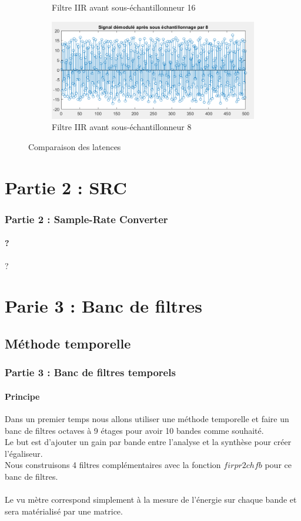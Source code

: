 \documentclass[
10pt,
aspectratio=169,
]{beamer}
\begin{document}
\begin{frame}
\begin{figure}
\begin{subfigure}{0.4\textwidth}
    \caption{Filtre IIR avant sous-échantillonneur 16}
\end{subfigure}
\begin{subfigure}{0.4\textwidth}
    \includegraphics[scale=0.3]{Images/lat_IIR_8.PNG}
    \caption{Filtre IIR avant sous-échantillonneur 8}
\end{subfigure}
        
\caption{Comparaison des latences}
\end{figure}
\end{frame}

\section{Partie 2 : SRC}
\begin{frame} 
\frametitle{Partie 2 : Sample-Rate Converter} 
\framesubtitle{?} 
?
\end{frame}


\section{Parie 3 : Banc de filtres}
\subsection{Méthode temporelle}

\begin{frame}
\frametitle{Partie 3 : Banc de filtres temporels} 
\framesubtitle{Principe}
Dans un premier temps nous allons utiliser une méthode temporelle et faire un banc de filtres octaves à 9 étages pour avoir 10 bandes comme souhaité. \\
Le but est d'ajouter un gain par bande entre l'analyse et la synthèse pour créer l'égaliseur. \\
Nous construisons 4 filtres complémentaires avec la fonction $firpr2chfb$ pour ce banc de filtres. \\ \\
Le vu mètre correspond simplement à la mesure de l'énergie sur chaque bande et sera matérialisé par une matrice.
\end{frame}
\end{document}
